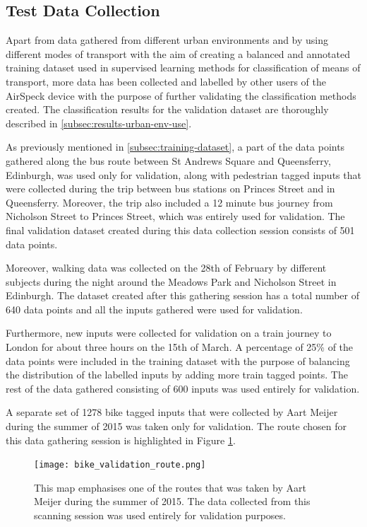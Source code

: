 \documentclass[bsc,frontabs,twoside,singlespacing,parskip,deptreport]{infthesis}     %
\begin{document}
\subsection{Test Data Collection}
\label{subsec:test-data-collection}

Apart from data gathered from different urban environments and by using different modes of transport with the aim of creating a balanced and annotated training dataset used in supervised learning methods for classification of means of transport, more data has been collected and labelled by other users of the AirSpeck device with the purpose of further validating the classification methods created. The classification results for the validation dataset are thoroughly described in \ref{subsec:results-urban-env-use}.

As previously mentioned in \ref{subsec:training-dataset}, a part of the data points gathered along the bus route between St Andrews Square and Queensferry, Edinburgh, was used only for validation, along with pedestrian tagged inputs that were collected during the trip between bus stations on Princes Street and in Queensferry. Moreover, the trip also included a 12 minute bus journey from Nicholson Street to Princes Street, which was entirely used for validation. The final validation dataset created during this data collection session consists of 501 data points.

Moreover, walking data was collected on the 28th of February by different subjects during the night around the Meadows Park and Nicholson Street in Edinburgh. The dataset created after this gathering session has a total number of 640 data points and all the inputs gathered were used for validation.

Furthermore, new inputs were collected for validation on a train journey to London for about three hours on the 15th of March. A percentage of 25\% of the data points were included in the training dataset with the purpose of balancing the distribution of the labelled inputs by adding more train tagged points. The rest of the data gathered consisting of 600 inputs was used entirely for validation.

A separate set of 1278 bike tagged inputs that were collected by Aart Meijer during the summer of 2015 was taken only for validation. The route chosen for this data gathering session is highlighted in Figure \ref{fig:bike-validation-route}.

\begin{figure}[h!]
  \center
  \texttt{[image: bike\_validation\_route.png]} 
  \caption{This map emphasises one of the routes that was taken by Aart Meijer during the summer of 2015. The data collected from this scanning session was used entirely for validation purposes.}
  \label{fig:bike-validation-route}
\end{figure}
\end{document}
